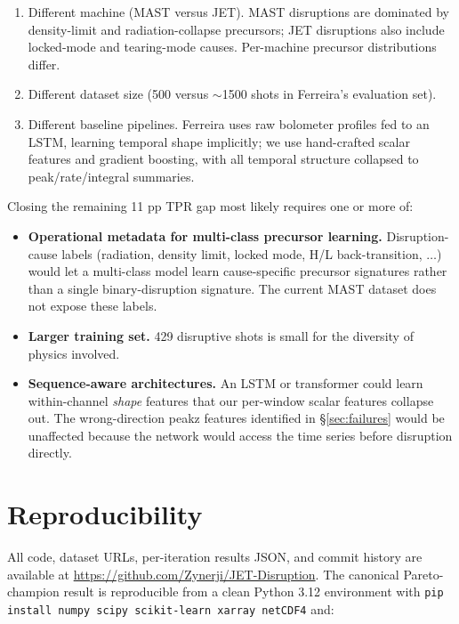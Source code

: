 \documentclass[11pt,letterpaper]{article}
\begin{document}
\begin{enumerate}[leftmargin=*,itemsep=0pt]
\item Different machine (MAST versus JET). MAST disruptions are dominated
  by density-limit and radiation-collapse precursors; JET disruptions
  also include locked-mode and tearing-mode causes. Per-machine
  precursor distributions differ.
\item Different dataset size (500 versus $\sim$1500 shots in Ferreira's
  evaluation set).
\item Different baseline pipelines. Ferreira uses raw bolometer profiles
  fed to an LSTM, learning temporal shape implicitly; we use hand-crafted
  scalar features and gradient boosting, with all temporal structure
  collapsed to peak/rate/integral summaries.
\end{enumerate}

Closing the remaining 11 pp TPR gap most likely requires one or more of:

\begin{itemize}[leftmargin=*,itemsep=0pt]
\item \textbf{Operational metadata for multi-class precursor learning.}
  Disruption-cause labels (radiation, density limit, locked mode,
  H/L back-transition, $\ldots$) would let a multi-class model learn
  cause-specific precursor signatures rather than a single
  binary-disruption signature. The current MAST dataset does not
  expose these labels.
\item \textbf{Larger training set.} 429 disruptive shots is small for
  the diversity of physics involved.
\item \textbf{Sequence-aware architectures.} An LSTM or transformer
  could learn within-channel \emph{shape} features that our per-window
  scalar features collapse out. The wrong-direction peakz features
  identified in \S\ref{sec:failures} would be unaffected because the
  network would access the time series before disruption directly.
\end{itemize}

\section{Reproducibility}\label{sec:repro}

All code, dataset URLs, per-iteration results JSON, and commit history
are available at \url{https://github.com/Zynerji/JET-Disruption}. The
canonical Pareto-champion result is reproducible from a clean Python
3.12 environment with
\texttt{pip install numpy scipy scikit-learn xarray netCDF4} and:
\end{document}
